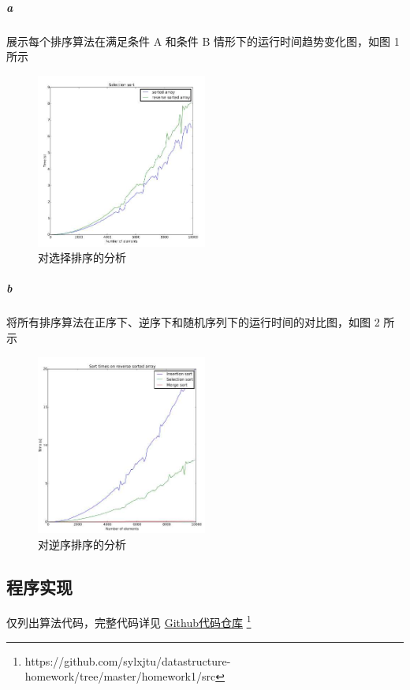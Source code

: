 \documentclass[UTF8]{ctexart}
\begin{document}
        \subparagraph{a} 展示每个排序算法在满足条件 A 和条件 B 情形下的运行时间趋势变化图，如图 1 所示

        \begin{figure}[H]
          \caption{对选择排序的分析}
          \centering
          \includegraphics[width=0.5\textwidth]{example1}
        \end{figure}

        \subparagraph{b} 将所有排序算法在正序下、逆序下和随机序列下的运行时间的对比图，如图 2 所示

        \begin{figure}[H]
          \caption{对逆序排序的分析}
          \centering
          \includegraphics[width=0.5\textwidth]{example2}
        \end{figure}

    \subsection{程序实现}
    仅列出算法代码，完整代码详见
      \href{https://github.com/sylxjtu/datastructure-homework/tree/master/homework1/src}{Github代码仓库}
      \footnote{https://github.com/sylxjtu/datastructure-homework/tree/master/homework1/src}
\end{document}
